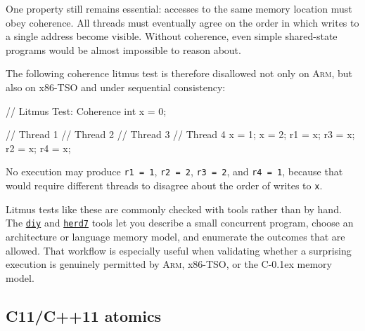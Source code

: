 \documentclass[fontsize=10pt, oneside]{scrartcl}
\newcommand{\monobox}[1]{\mbox{\texttt{#1}}}
\newcommand{\cplusplus}[1]{C\kern-0.1ex\raisebox{0.15ex}{\texttt{++}}#1}
\begin{document}
One property still remains essential: accesses to the same memory location must obey coherence.
All threads must eventually agree on the order in which writes to a single address become visible.
Without coherence, even simple shared-state programs would be almost impossible to reason about.

The following coherence litmus test is therefore disallowed not only on \textsc{Arm}, but also on x86-TSO and under sequential consistency:

\begin{ccode}
// Litmus Test: Coherence
int x = 0;

// Thread 1    // Thread 2    // Thread 3    // Thread 4
x = 1;         x = 2;         r1 = x;        r3 = x;
                              r2 = x;        r4 = x;
\end{ccode}

No execution may produce \monobox{r1 = 1}, \monobox{r2 = 2}, \monobox{r3 = 2}, and \monobox{r4 = 1}, because that would require different threads to disagree about the order of writes to \monobox{x}.

Litmus tests like these are commonly checked with tools rather than by hand.
The \href{https://diy.inria.fr/}{\texttt{diy}} and \href{https://github.com/herd/herdtools7}{\texttt{herd7}} tools let you describe a small concurrent program, choose an architecture or language memory model, and enumerate the outcomes that are allowed.
That workflow is especially useful when validating whether a surprising execution is genuinely permitted by \textsc{Arm}, x86-TSO, or the \cplusplus{} memory model.

\subsection{C11/C++11 atomics}
\end{document}
